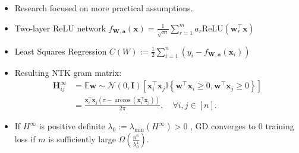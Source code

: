 \documentclass[serif, aspectratio=169]{beamer}
\newcommand{\relu}{\text{ReLU}}
\newcommand{\E}{\mathbb{E}}
\begin{document}
\begin{frame}
	\begin{itemize}
		\item Research focused on more practical assumptions.
		\item Two-layer ReLU network \(f_{\mathbf{W},\mathbf{a}}(\mathbf{x}) = \frac{1}{\sqrt{m}}\sum_{r=1}^{m} a_r \relu(\mathbf{w}_r^\top \mathbf{x})
		\)
		\item Least Squares Regression \(C(W):=\frac{1}{2}\sum_{i=1}^{n}(y_i - f_{\mathbf{W},\mathbf{a}}(\mathbf{x}_i))\)
		\item Resulting NTK gram matrix:
		\begin{align}
			\mathbf{H}_{ij}^\infty &= \E{\mathbf{w} \sim \mathcal{N}(0,\mathbf{I})}\left[ \mathbf{x}_i^\top \mathbf{x}_j\mathbb{I}\left\{\mathbf{w}^\top \mathbf{x}_i \ge 0, \mathbf{w}^\top \mathbf{x}_j \ge 0\right\}\right] \\
			&= \frac{\mathbf{x}_i^\top\mathbf{x}_j\left(\pi - \arccos(\mathbf{x}_i^\top\mathbf{x}_j)\right)}{2\pi}, \quad \forall i, j\in[n].
		\end{align}
		\item  If \(H^\infty\) is positive
		definite \(\lambda_0 := \lambda_{\min}(H^{\infty})>0\) , GD converges to \(0\) training loss if \(m\) is sufficiently large \(\Omega(\frac{n^6}{\lambda_0^4})\).
	\end{itemize}
\end{frame}



\end{document}
